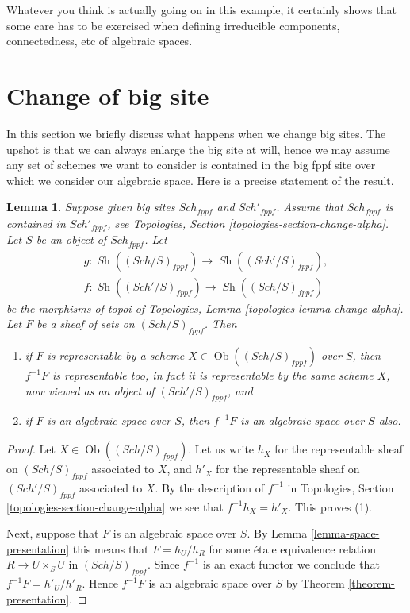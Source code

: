\documentclass{stacks-project}
\theoremstyle{plain}
\newtheorem{lemma}[subsection]{Lemma}
\theoremstyle{definition}
\theoremstyle{remark}
\numberwithin{equation}{subsection}
\def\Sch{\mathit{Sch}}
\def\Ob{\mathop{\mathrm{Ob}}\nolimits}
\def\Sh{\mathop{\mathit{Sh}}\nolimits}
\begin{document}
\noindent
Whatever you think is actually going on in this example, it certainly
shows that some care has to be exercised when defining irreducible
components, connectedness, etc of algebraic spaces.






\section{Change of big site}
\label{section-change-big-site}

\noindent
In this section we briefly discuss what happens when we change big sites.
The upshot is that we can always enlarge the big site at will, hence we
may assume any set of schemes we want to consider is contained in the big
fppf site over which we consider our algebraic space. Here is a precise
statement of the result.

\begin{lemma}
\label{lemma-change-big-site}
Suppose given big sites $\Sch_{fppf}$ and $\Sch'_{fppf}$.
Assume that $\Sch_{fppf}$ is contained in $\Sch'_{fppf}$,
see Topologies, Section \ref{topologies-section-change-alpha}.
Let $S$ be an object of $\Sch_{fppf}$. Let
\begin{align*}
g : \Sh((\Sch/S)_{fppf})
\longrightarrow
\Sh((\Sch'/S)_{fppf}), \\
f : \Sh((\Sch'/S)_{fppf})
\longrightarrow
\Sh((\Sch/S)_{fppf})
\end{align*}
be the morphisms of topoi of
Topologies, Lemma \ref{topologies-lemma-change-alpha}.
Let $F$ be a sheaf of sets on $(\Sch/S)_{fppf}$. Then
\begin{enumerate}
\item if $F$ is representable by a scheme
$X \in \Ob((\Sch/S)_{fppf})$ over $S$,
then $f^{-1}F$ is representable too, in fact it is representable by the
same scheme $X$, now viewed as an object of $(\Sch'/S)_{fppf}$, and
\item if $F$ is an algebraic space over $S$, then $f^{-1}F$ is an algebraic
space over $S$ also.
\end{enumerate}
\end{lemma}

\begin{proof}
Let $X \in \Ob((\Sch/S)_{fppf})$. Let us write $h_X$ for the
representable sheaf on $(\Sch/S)_{fppf}$ associated to $X$, and
$h'_X$ for the representable sheaf on $(\Sch'/S)_{fppf}$ associated to
$X$. By the description of $f^{-1}$ in
Topologies, Section \ref{topologies-section-change-alpha}
we see that $f^{-1}h_X = h'_X$. This proves (1).

\medskip\noindent
Next, suppose that $F$
is an algebraic space over $S$. By Lemma \ref{lemma-space-presentation}
this means that $F = h_U/h_R$ for some \'etale equivalence relation
$R \to U \times_S U$ in $(\Sch/S)_{fppf}$. Since $f^{-1}$ is an
exact functor we conclude that $f^{-1}F = h'_U/h'_R$. Hence
$f^{-1}F$ is an algebraic space over $S$ by Theorem \ref{theorem-presentation}.
\end{proof}
\end{document}
